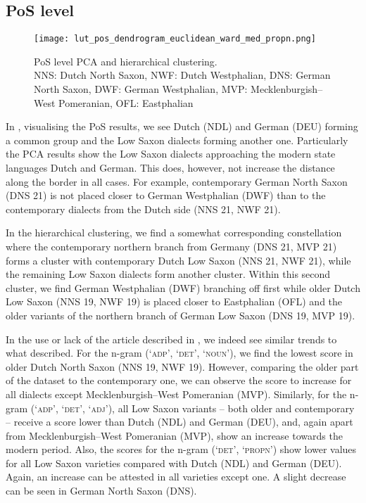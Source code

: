 \documentclass[output=paper,colorlinks,citecolor=brown]{langscibook}
\begin{document}
\subsection{PoS level}\label{pos-level-results}

\begin{figure}
\begin{minipage}{0.48\textwidth}
    \centering
\end{minipage}\hfill%
\begin{minipage}{0.48\textwidth}
    \centering
    \texttt{[image: lut\_pos\_dendrogram\_euclidean\_ward\_med\_propn.png]}
    \caption{PoS level PCA and hierarchical clustering.\\NNS: Dutch North Saxon, NWF: Dutch Westphalian, DNS: German North Saxon, DWF: German Westphalian, MVP: Mecklenburgish--West Pomeranian, OFL: Eastphalian}
    \label{fig:pos_based_clusters}
\end{minipage}%
\end{figure}

In , visualising the PoS results, we see Dutch (NDL) and German (DEU) forming a common group and the Low Saxon dialects forming another one. 
Particularly the PCA results show the Low Saxon dialects approaching the modern state languages Dutch and German. This does, however, not increase the distance along the border in all cases. For example, contemporary German North Saxon (DNS 21) is not placed closer to German Westphalian (DWF) than to the contemporary dialects from the Dutch side (NNS 21, NWF 21). 

In the hierarchical clustering, we find a somewhat corresponding constellation where the contemporary northern branch from Germany (DNS 21, MVP 21) forms a cluster with contemporary Dutch Low Saxon (NNS 21, NWF 21), while the remaining Low Saxon dialects form another cluster. Within this second cluster, we find German Westphalian (DWF) branching off first while older Dutch Low Saxon (NNS 19, NWF 19) is placed closer to Eastphalian (OFL) and the older variants of the northern branch of German Low Saxon (DNS 19, MVP 19). 

In the use or lack of the article described in , we indeed see similar trends to what \citet{Pheiff2022} described. For the n-gram (`\textsc{adp}', `\textsc{det}', `\textsc{noun}'), we find the lowest score in older Dutch North Saxon (NNS 19, NWF 19). However, comparing the older part of the dataset to the contemporary one, we can observe the score to increase for all dialects except Mecklenburgish--West Pomeranian (MVP). Similarly, for the n-gram (`\textsc{adp}', `\textsc{det}', `\textsc{adj}'), all Low Saxon variants -- both older and contemporary -- receive a score lower than Dutch (NDL) and German (DEU), and, again apart from Mecklenburgish--West Pomeranian (MVP), show an increase towards the modern period. Also, the scores for the n-gram (`\textsc{det}', `\textsc{propn}') show lower values for all Low Saxon varieties compared with Dutch (NDL) and German (DEU). Again, an increase can be attested in all varieties except one. A slight decrease can be seen in German North Saxon (DNS).
\end{document}
